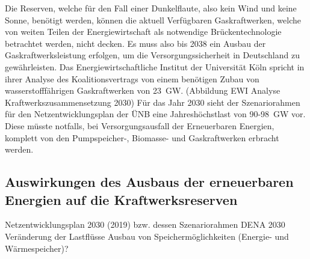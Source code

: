 	Die Reserven, welche für den Fall einer Dunkelflaute, also kein Wind und keine Sonne, benötigt werden, können die aktuell Verfügbaren Gaskraftwerken, welche von weiten Teilen der Energiewirtschaft als notwendige Brückentechnologie betrachtet werden, nicht decken. Es muss also bis 2038 ein Ausbau der Gaskraftwerksleistung erfolgen, um die Versorgungssicherheit in Deutschland zu gewährleisten. Das Energiewirtschaftliche Institut der Universität Köln spricht in ihrer Analyse des Koalitionsvertrags von einem benötigen Zubau von wasserstofffährigen Gaskraftwerken von \SI{23}{\giga \watt}. (Abbildung EWI Analyse Kraftwerkszusammensetzung 2030)
	Für das Jahr 2030 sieht der Szenariorahmen für den Netzentwicklungsplan der ÜNB eine Jahreshöchstlast von 90-\SI{98}{\giga \watt} vor. Diese müsste notfalls, bei Versorgungsausfall der Erneuerbaren Energien, komplett von den Pumpspeicher-, Biomasse- und Gaskraftwerken erbracht werden.
	
	
	
	
		
	\subsection{Auswirkungen des Ausbaus der erneuerbaren Energien auf die Kraftwerksreserven}
	Netzentwicklungsplan 2030 (2019) bzw. dessen Szenariorahmen
	DENA 2030 Veränderung der Lastflüsse
	Ausbau von Speichermöglichkeiten (Energie- und Wärmespeicher)?
	